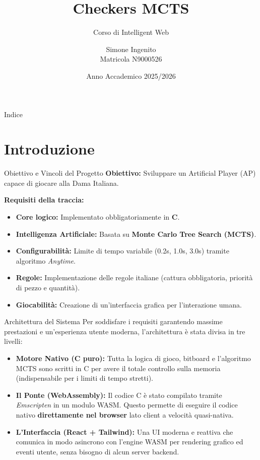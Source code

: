 \documentclass[10pt]{beamer}
\title[Checkers MCTS]{Checkers MCTS}
\subtitle{Corso di Intelligent Web}
\author{Simone Ingenito \\ \vspace{0.2cm} \small Matricola N9000526}
\institute{Università degli Studi di Napoli Federico II}
\date{Anno Accademico 2025/2026}
\begin{document}
\begin{frame}
    \titlepage
\end{frame}

\begin{frame}{Indice}
    \tableofcontents
\end{frame}

\section{Introduzione}
\begin{frame}{Obiettivo e Vincoli del Progetto}
    \textbf{Obiettivo:} Sviluppare un Artificial Player (AP) capace di giocare alla Dama Italiana.
    
    \vspace{0.4cm}
    \textbf{Requisiti della traccia:}
    \begin{itemize}
        \item \textbf{Core logico:} Implementato obbligatoriamente in \textbf{C}.
        \item \textbf{Intelligenza Artificiale:} Basata su \textbf{Monte Carlo Tree Search (MCTS)}.
        \item \textbf{Configurabilità:} Limite di tempo variabile (0.2s, 1.0s, 3.0s) tramite algoritmo \textit{Anytime}.
        \item \textbf{Regole:} Implementazione delle regole italiane (cattura obbligatoria, priorità di pezzo e quantità).
        \item \textbf{Giocabilità:} Creazione di un'interfaccia grafica per l'interazione umana.
    \end{itemize}
\end{frame}

\begin{frame}{Architettura del Sistema}
    Per soddisfare i requisiti garantendo massime prestazioni e un'esperienza utente moderna, l'architettura è stata divisa in tre livelli:
    
    \vspace{0.4cm}
    \begin{itemize}
        \item \textbf{Motore Nativo (C puro):} Tutta la logica di gioco, bitboard e l'algoritmo MCTS sono scritti in C per avere il totale controllo sulla memoria (indispensabile per i limiti di tempo stretti).
        \item \textbf{Il Ponte (WebAssembly):} Il codice C è stato compilato tramite \textit{Emscripten} in un modulo WASM. Questo permette di eseguire il codice nativo \textbf{direttamente nel browser} lato client a velocità quasi-nativa.
        \item \textbf{L'Interfaccia (React + Tailwind):} Una UI moderna e reattiva che comunica in modo asincrono con l'engine WASM per rendering grafico ed eventi utente, senza bisogno di alcun server backend.
    \end{itemize}
\end{frame}
\end{document}
